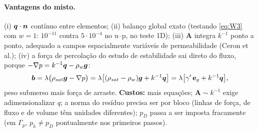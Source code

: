 \documentclass[11pt,a4paper]{article}
\newcommand{\bg}{\boldsymbol{g}}\newcommand{\bt}{\boldsymbol{t}}\newcommand{\bsig}{\boldsymbol{\sigma}}
\begin{document}
\paragraph{Vantagens do misto.} (i) $\boldsymbol{q}\cdot\boldsymbol{n}$ contínuo entre elementos; (ii) balanço global exato (testando \eqref{eq:W3} com $w=1$: $10^{-11}$ contra
$5\cdot10^{-4}$ no u--p, no teste 1D); (iii) $\mathbf A$ integra $k^{-1}$ ponto a ponto, adequado a campos espacialmente variáveis de
permeabilidade (Ceron et al.); (iv) a força de percolação do estudo de estabilidade sai direto do fluxo, porque
$-\nabla p=k^{-1}\bq-\rho_w\bg$:
\begin{equation}
 \bb=\lambda\bigl(\rho_{sat}\bg-\nabla p\bigr)=\lambda\bigl[(\rho_{sat}-\rho_w)\bg+k^{-1}\bq\bigr]
 =\lambda\bigl[\gamma'\,\mathbf e_g+k^{-1}\bq\bigr],
\end{equation}
peso submerso mais força de arraste. \textbf{Custos:} mais equações; $\mathbf A\sim k^{-1}$ exige adimensionalizar $q$; a norma do resíduo precisa ser por
bloco (linhas de força, de fluxo e de volume têm unidades diferentes); $p_D$ passa a ser imposta fracamente (em $\Gamma_p$, $p_h\neq p_D$ pontualmente nos
primeiros passos).

\end{document}
